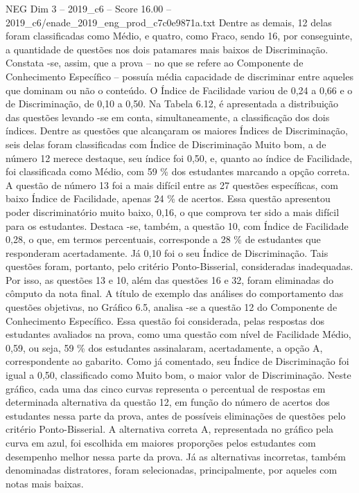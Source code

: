 \begin{textsample}{NEG Dim 3 – 2019\_c6 – Score 16.00 – 2019\_c6/enade\_2019\_eng\_prod\_c7c0e9871a.txt}
Dentre as demais, 12 delas foram classificadas como Médio, e quatro, como Fraco, sendo 16, por conseguinte, a quantidade de questões nos dois patamares mais baixos de Discriminação.
Constata -se, assim, que a prova – no que se refere ao Componente de Conhecimento Específico – possuía média capacidade de discriminar entre aqueles que dominam ou não o conteúdo.
O Índice de Facilidade variou de 0,24 a 0,66 e o de Discriminação, de 0,10 a 0,50.
Na Tabela 6.12, é apresentada a distribuição das questões levando -se em conta, simultaneamente, a classificação dos dois índices.
Dentre as questões que alcançaram os maiores Índices de Discriminação, seis delas foram classificadas com Índice de Discriminação Muito bom, a de número 12 merece destaque, seu índice foi 0,50, e, quanto ao índice de Facilidade, foi classificada como Médio, com 59 \% dos estudantes marcando a opção correta.
A questão de número 13 foi a mais difícil entre as 27 questões específicas, com baixo Índice de Facilidade, apenas 24 \% de acertos.
Essa questão apresentou poder discriminatório muito baixo, 0,16, o que comprova ter sido a mais difícil para os estudantes.
Destaca -se, também, a questão 10, com Índice de Facilidade 0,28, o que, em termos percentuais, corresponde a 28 \% de estudantes que responderam acertadamente.
Já 0,10 foi o seu Índice de Discriminação.
Tais questões foram, portanto, pelo critério Ponto-Bisserial, consideradas inadequadas.
Por isso, as questões 13 e 10, além das questões 16 e 32, foram eliminadas do cômputo da nota final.
A título de exemplo das análises do comportamento das questões objetivas, no Gráfico 6.5, analisa -se a questão 12 do Componente de Conhecimento Específico.
Essa questão foi considerada, pelas respostas dos estudantes avaliados na prova, como uma questão com nível de Facilidade Médio, 0,59, ou seja, 59 \% dos estudantes assinalaram, acertadamente, a opção A, correspondente ao gabarito.
Como já comentado, seu Índice de Discriminação foi igual a 0,50, classificado como Muito bom, o maior valor de Discriminação.
Neste gráfico, cada uma das cinco curvas representa o percentual de respostas em determinada alternativa da questão 12, em função do número de acertos dos estudantes nessa parte da prova, antes de possíveis eliminações de questões pelo critério Ponto-Bisserial.
A alternativa correta A, representada no gráfico pela curva em azul, foi escolhida em maiores proporções pelos estudantes com desempenho melhor nessa parte da prova.
Já as alternativas incorretas, também denominadas distratores, foram selecionadas, principalmente, por aqueles com notas mais baixas.

\end{textsample}
